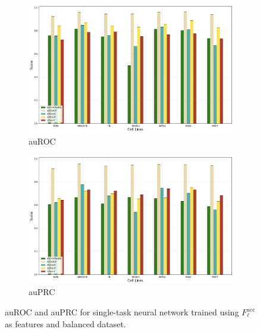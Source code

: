 \begin{figure}[!htbp]
    \centering
    \begin{subfigure}[b]{\textwidth}
        \includegraphics[width=\textwidth]{images/results_plots/single_tasks/balanced_old_auroc.png}
        \caption{auROC}
        \label{fig:auroc_balanced_old}
    \end{subfigure}
    \begin{subfigure}[b]{\textwidth}
        \includegraphics[width=\textwidth]{images/results_plots/single_tasks/balanced_old_auprc.png}
        \caption{auPRC}
        \label{fig:auprc_balanced_old}
    \end{subfigure}
    \caption{auROC and auPRC for single-task neural network trained using $F_\ell^{\textrm{acc}}$ as features and balanced dataset.}\label{fig:balanced_old_results}
\end{figure}

